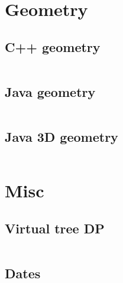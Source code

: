 \documentclass[letterpaper,landscape]{article}
\begin{document}
\begin{multicols*}{2}
  \section{Geometry}

  \subsection{C++ geometry}
  \inputminted{cpp}{src/geom_library.cpp}
  
  \subsection{Java geometry}
  \inputminted{java}{src/JavaGeometry.java}
  
  \subsection{Java 3D geometry}
  \inputminted{java}{src/Geom3D.java}

  \section{Misc}

  \subsection{Virtual tree DP}
  \inputminted{cpp}{src/misc_virtual_tree.cpp}
  
  \subsection{Dates}
  \inputminted{cpp}{src/dates.cpp}
  
\end{multicols*}
\end{document}

